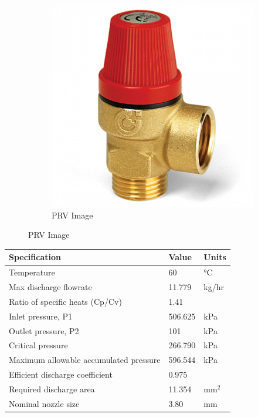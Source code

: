 \begin{figure}[H]
\begin{subfigure}{0.49\linewidth}
        \includegraphics[width=\linewidth]{chapters/Z-support/figures/product_a_l_altecnic-caleffi-safety-relief-valve-1-2-6-bar-312460-small.jpg}
        \caption{PRV Image \cite{unvented_components_europe_caleffi_nodate}}
    \end{subfigure}
\end{figure}

\begin{table}[H]
\centering
\begin{tabular}{@{}l|l|l@{}}
\toprule
\textbf{Specification}                    & \textbf{Value} & \textbf{Units} \\ \midrule
Temperature                               & 60             & °C             \\ \midrule
Max discharge   flowrate                  & 11.779         & kg/hr          \\ \midrule
Ratio of   specific heats (Cp/Cv)  \cite{api_standard_520_sizing_2013}      & 1.41           &                \\ \midrule
Inlet   pressure, P1                      & 506.625        & kPa            \\ \midrule
Outlet   pressure, P2                     & 101            & kPa            \\ \midrule
Critical   pressure                       & 266.790        & kPa            \\ \midrule
Maximum   allowable accumulated  pressure & 596.544        & kPa            \\ \midrule
Efficient   discharge coefficient          & 0.975          &                \\ \midrule
Required   discharge area                 & 11.354         & mm$^2$            \\ \midrule
Nominal nozzle   size                     & 3.80           & mm             \\ \bottomrule
\end{tabular}
\end{table}

